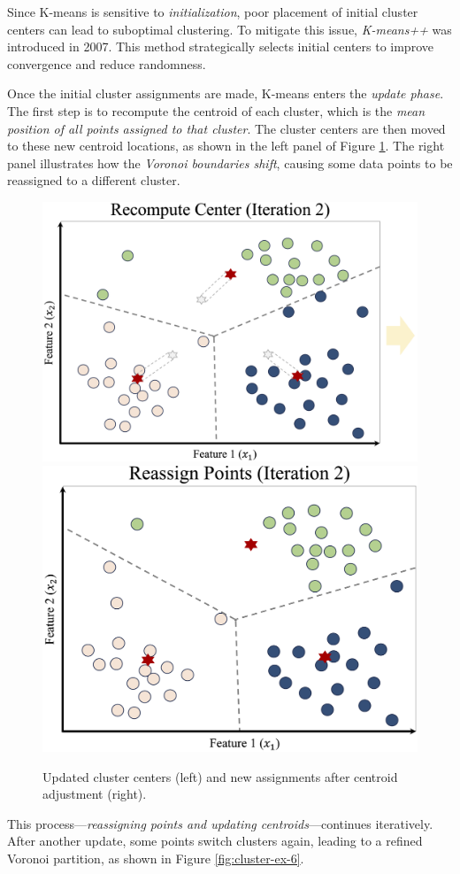 \documentclass[
]{book}
\theoremstyle{definition}
\theoremstyle{definition}
\theoremstyle{definition}
\theoremstyle{definition}
\theoremstyle{remark}
\begin{document}
Since K-means is sensitive to \emph{initialization}, poor placement of initial cluster centers can lead to suboptimal clustering. To mitigate this issue, \emph{K-means++} \citep{arthur2006k} was introduced in 2007. This method strategically selects initial centers to improve convergence and reduce randomness.

Once the initial cluster assignments are made, K-means enters the \emph{update phase}. The first step is to recompute the centroid of each cluster, which is the \emph{mean position of all points assigned to that cluster}. The cluster centers are then moved to these new centroid locations, as shown in the left panel of Figure \ref{fig:cluster-ex-3}. The right panel illustrates how the \emph{Voronoi boundaries shift}, causing some data points to be reassigned to a different cluster.

\begin{figure}

{\centering \includegraphics[width=0.45\linewidth]{images/ch13_cluster_ex_4} \includegraphics[width=0.45\linewidth]{images/ch13_cluster_ex_5} 

}

\caption{Updated cluster centers (left) and new assignments after centroid adjustment (right).}\label{fig:cluster-ex-3}
\end{figure}

This process---\emph{reassigning points and updating centroids}---continues iteratively. After another update, some points switch clusters again, leading to a refined Voronoi partition, as shown in Figure \ref{fig:cluster-ex-6}.
\end{document}
